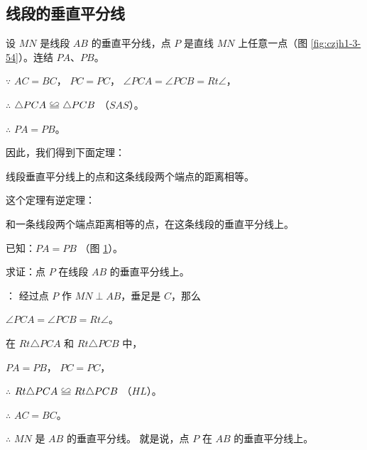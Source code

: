\subsection{线段的垂直平分线}\label{subsec:czjh1-3-15}

设 $MN$ 是线段 $AB$ 的垂直平分线，点 $P$ 是直线 $MN$ 上任意一点（图 \ref{fig:czjh1-3-54}）。连结 $PA$、$PB$。

\begin{figure}[htbp]
    \centering
    \begin{minipage}[b]{7cm}
        \centering
        
        \caption{}\label{fig:czjh1-3-54}
    \end{minipage}
    \qquad
    \begin{minipage}[b]{7cm}
        \centering
        
        \caption{}\label{fig:czjh1-3-55}
    \end{minipage}
\end{figure}


$\because$ \quad $AC = BC$， $PC = PC$， $\angle PCA = \angle PCB = Rt \angle$，

$\therefore$ \quad $\triangle PCA \quandeng \triangle PCB$ （$SAS$）。

$\therefore$ \quad $PA = PB$。

因此，我们得到下面定理：

\begin{dingli}[定理]
    线段垂直平分线上的点和这条线段两个端点的距离相等。
\end{dingli}

这个定理有逆定理：

\begin{dingli}[逆定理]
    和一条线段两个端点距离相等的点，在这条线段的垂直平分线上。
\end{dingli}

已知：$PA = PB$ （图 \ref{fig:czjh1-3-55}）。

求证：点 $P$ 在线段 $AB$ 的垂直平分线上。

\zhengming： 经过点 $P$ 作 $MN \perp AB$，垂足是 $C$，那么

$\angle PCA = \angle PCB = Rt \angle$。

在 $Rt \triangle PCA$ 和 $Rt \triangle PCB$ 中，

$PA = PB$， $PC = PC$，

$\therefore$ \quad $Rt \triangle PCA \quandeng Rt \triangle PCB$ （$HL$）。

$\therefore$ \quad $AC = BC$。

$\therefore$ \quad $MN$ 是 $AB$ 的垂直平分线。 就是说，点 $P$ 在 $AB$ 的垂直平分线上。

